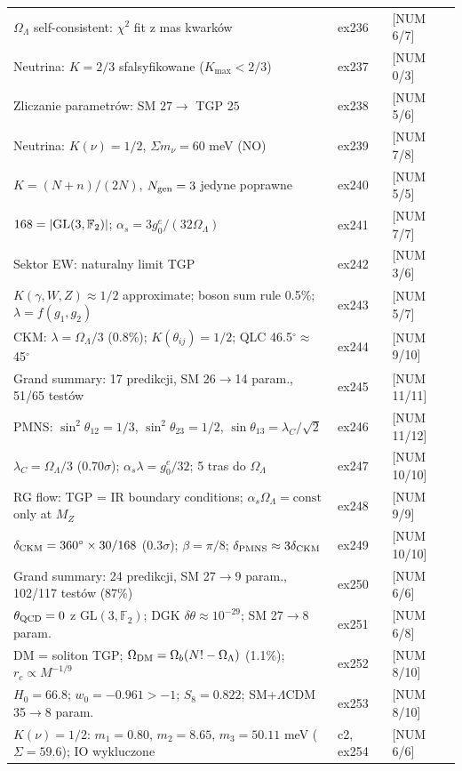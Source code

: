 \begin{center}
\begin{tabular}{@{}lll@{}}
$\Omega_\Lambda$ self-consistent: $\chi^2$ fit z mas kwark\'ow & ex236 & [NUM 6/7] \\
Neutrina: $K=2/3$ sfalsyfikowane ($K_{\max} < 2/3$) & ex237 & [NUM 0/3] \\
Zliczanie parametr\'ow: SM $27 \to$ TGP $25$ & ex238 & [NUM 5/6] \\
Neutrina: $K(\nu)=1/2$, $\Sigma m_\nu = 60$ meV (NO) & ex239 & [NUM 7/8] \\
$K = (N+n)/(2N)$, $N_{\rm gen}=3$ jedyne poprawne & ex240 & [NUM 5/5] \\
$168 = |{\rm GL}(3,\mathbb{F}_2)|$; $\alpha_s = 3g_0^e/(32\Omega_\Lambda)$ & ex241 & [NUM 7/7] \\
Sektor EW: naturalny limit TGP & ex242 & [NUM 3/6] \\
$K(\gamma,W,Z)\approx 1/2$ approximate; boson sum rule 0.5\%; $\lambda=f(g_1,g_2)$ & ex243 & [NUM 5/7] \\
CKM: $\lambda=\Omega_\Lambda/3$ (0.8\%); $K(\theta_{ij})=1/2$; QLC 46.5$^\circ\approx$45$^\circ$ & ex244 & [NUM 9/10] \\
Grand summary: 17 predikcji, SM 26$\to$14 param., 51/65 test\'ow & ex245 & [NUM 11/11] \\
PMNS: $\sin^2\theta_{12}=1/3$, $\sin^2\theta_{23}=1/2$, $\sin\theta_{13}=\lambda_C/\sqrt{2}$ & ex246 & [NUM 11/12] \\
$\lambda_C=\Omega_\Lambda/3$ (0.70$\sigma$); $\alpha_s\lambda=g_0^e/32$; 5 tras do $\Omega_\Lambda$ & ex247 & [NUM 10/10] \\
RG flow: TGP = IR boundary conditions; $\alpha_s\Omega_\Lambda=\text{const}$ only at $M_Z$ & ex248 & [NUM 9/9] \\
$\delta_{\rm CKM}=360^\circ\times30/168$ (0.3$\sigma$); $\beta=\pi/8$; $\delta_{\rm PMNS}\approx3\delta_{\rm CKM}$ & ex249 & [NUM 10/10] \\
Grand summary: 24 predikcji, SM 27$\to$9 param., 102/117 test\'ow (87\%) & ex250 & [NUM 6/6] \\
$\theta_{\rm QCD}=0$ z GL$(3,\mathbb{F}_2)$; DGK $\delta\theta\approx 10^{-29}$; SM 27$\to$8 param. & ex251 & [NUM 6/8] \\
DM = soliton TGP; $\Omega_{\rm DM}=\Omega_b(N!-\Omega_\Lambda)$ (1.1\%); $r_c\propto M^{-1/9}$ & ex252 & [NUM 8/10] \\
$H_0=66.8$; $w_0=-0.961>-1$; $S_8=0.822$; SM+$\Lambda$CDM 35$\to$8 param. & ex253 & [NUM 8/10] \\
$K(\nu)=1/2$: $m_1{=}0.80$, $m_2{=}8.65$, $m_3{=}50.11$ meV ($\Sigma=59.6$); IO wykluczone & c2, ex254 & [NUM 6/6] \\

\end{tabular}
\end{center}
